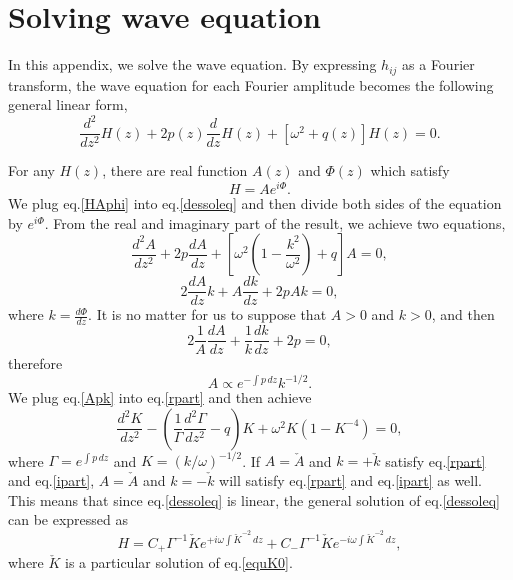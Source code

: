 \documentclass[
    jor,
    amsmath,amssymb,preprint,
    superscriptaddress,
]{revtex4-2}
\begin{document}
\appendix
\section{Solving wave equation}
\label{sec:appa}
In this appendix, we solve the wave equation. By expressing $h_{ij}$ as a Fourier transform, the
wave equation for each Fourier amplitude becomes the following general linear form,
\begin{equation}
    \frac{d^2}{d z^2}H(z)+2p(z)\frac{d}{d z}H(z)+\left[\omega^2+q(z)\right]H(z)=0.\label{dessoleq}
\end{equation}

For any $H(z)$, there are real function $A(z)$ and $\Phi(z)$ which satisfy
\begin{equation}\label{HAphi}
    H=Ae^{i\Phi}.
\end{equation}
We plug eq.\eqref{HAphi} into eq.\eqref{dessoleq} and then divide both sides of the equation by $e^{i\Phi}$. From the real and imaginary part of the result, we achieve two equations,
\begin{equation}\label{rpart}
    \frac{d^2 A}{d z^2}+2p\frac{d A}{d z}+\left[\omega^2\left(1-\frac{k^2}{\omega^2}\right)+q\right]A=0,
\end{equation}
\begin{equation}\label{ipart}
    2\frac{d A}{d z}k+A\frac{d k}{d z}+2pAk=0,
\end{equation}
where $k=\frac{d \Phi}{d z}$. It is no matter for us to suppose that $A>0$ and $k>0$, and then
\begin{equation}
    2\frac{1}{A}\frac{d A}{d z}+\frac{1}{k}\frac{d k}{d z}+2p=0,
\end{equation}
therefore
\begin{equation}\label{Apk}
    A\propto e^{-\int p\,dz}k^{-1/2}.
\end{equation}
We plug eq.\eqref{Apk} into eq.\eqref{rpart} and then achieve
\begin{equation}\label{equK0}
    \frac{d^2 K}{d z^2}-\left(\frac{1}{\Gamma}\frac{d^2\Gamma}{d z^2}-q\right)K+\omega^2K(1-K^{-4})=0,
\end{equation}
where $\Gamma=e^{\int p \,dz}$ and $K=(k/\omega)^{-1/2}$. If $A=\check{A}$ and $k=+\check{k}$ satisfy eq.\eqref{rpart} and eq.\eqref{ipart}, $A=\check{A}$ and $k=-\check{k}$ will satisfy eq.\eqref{rpart} and eq.\eqref{ipart} as well. This means that since eq.\eqref{dessoleq} is linear, the general solution of eq.\eqref{dessoleq} can be expressed as
\begin{equation}
    H=C_+\Gamma^{-1}\check{K}e^{+i\omega\int  \check{K}^{-2}\,d z}+C_-\Gamma^{-1}\check{K}e^{-i\omega\int  \check{K}^{-2}\,d z},
\end{equation}
where $\check{K}$ is a particular solution of eq.\eqref{equK0}.
\end{document}
